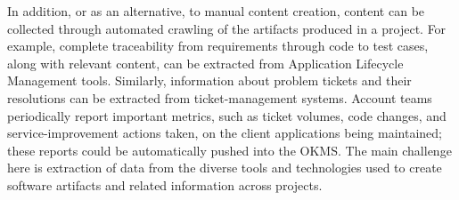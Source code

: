 
In addition, or as an alternative, to manual content creation, content can be
collected through automated crawling of the artifacts produced in a project. For
example, complete traceability from requirements through code to test cases,
along with relevant content, can be extracted from Application Lifecycle
Management tools. Similarly, information about problem tickets and their
resolutions can be extracted from ticket-management systems.  Account teams
periodically report important metrics, such as ticket volumes, code changes, and
service-improvement actions taken, on the client applications being maintained;
these reports could be automatically pushed into the OKMS. The main challenge
here is extraction of data from the diverse tools and technologies used to
create software artifacts and related information across projects.

